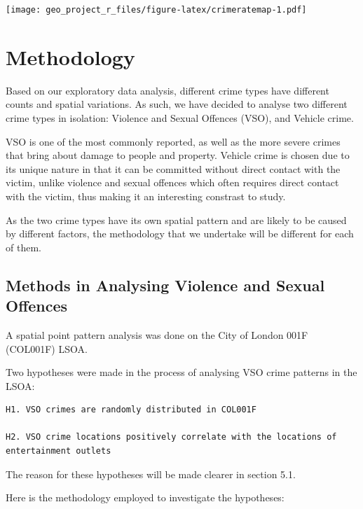 \documentclass[]{article}
\theoremstyle{definition}
\theoremstyle{definition}
\theoremstyle{definition}
\theoremstyle{remark}
\begin{document}
\texttt{[image: geo\_project\_r\_files/figure-latex/crimeratemap-1.pdf]}
\pagebreak

\section{Methodology}\label{methodology}

Based on our exploratory data analysis, different crime types have
different counts and spatial variations. As such, we have decided to
analyse two different crime types in isolation: Violence and Sexual
Offences (VSO), and Vehicle crime.

VSO is one of the most commonly reported, as well as the more severe
crimes that bring about damage to people and property. Vehicle crime is
chosen due to its unique nature in that it can be committed without
direct contact with the victim, unlike violence and sexual offences
which often requires direct contact with the victim, thus making it an
interesting constrast to study.

As the two crime types have its own spatial pattern and are likely to be
caused by different factors, the methodology that we undertake will be
different for each of them.

\subsection{Methods in Analysing Violence and Sexual
Offences}\label{methods-in-analysing-violence-and-sexual-offences}

A spatial point pattern analysis was done on the City of London 001F
(COL001F) LSOA.

Two hypotheses were made in the process of analysing VSO crime patterns
in the LSOA:

\begin{verbatim}
H1. VSO crimes are randomly distributed in COL001F 

H2. VSO crime locations positively correlate with the locations of entertainment outlets
\end{verbatim}

The reason for these hypotheses will be made clearer in section 5.1.

Here is the methodology employed to investigate the hypotheses:
\end{document}
